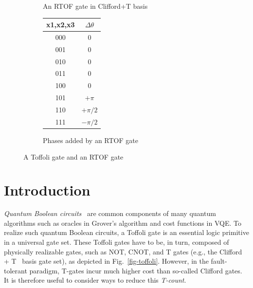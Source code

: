\documentclass[paper]{ieice}
\makeatletter
\newcommand{\sublabel}[1]{\protected@edef\@currentlabel{\thefigure(\thesubfigure)}\label{#1}} %
\providecommand{\DIFadd}[1]{{\protect\color{blue}{#1}}} %
\providecommand{\DIFaddbegin}{} %
\providecommand{\DIFaddend}{} %
\newcommand{\DIFaddincludegraphics}[2][]{{\color{blue}\fbox{\DIFOincludegraphics[#1]{#2}}}} %
\DeclareRobustCommand{\DIFaddbegin}{\DIFOaddbegin \let\includegraphics\DIFaddincludegraphics} %
\DeclareRobustCommand{\DIFaddend}{\DIFOaddend \let\includegraphics\DIFOincludegraphics} %
\makeatother
\begin{document}
\begin{figure}[t]
\begin{minipage}{0.6\textwidth}
\begin{subfigure}[b][15mm]{0.9\textwidth}
            \caption{An RTOF gate in Clifford+T basis}
            \sublabel{fig-rtof}
        \end{subfigure}
    \end{minipage}
    \hspace{10mm}
    \begin{minipage}{0.3\textwidth}
    \vspace{10mm}
        \begin{subfigure}[b][30mm]{\textwidth}
        \centering
        \begin{tabular}{c|c}      
            \hline
            {x1,x2,x3} & $\Delta\theta$  \\  
            \hline
            000   & 0      \\
            001   & 0      \\
            010   & 0      \\
            011   & 0      \\
            100   & 0      \\
            101   & $+\pi$          \\
            110   & $+\pi/2$   \\
            111   & $-\pi/2$ \\
            \hline
        \end{tabular}
        \caption{Phases added by an RTOF gate}
        \sublabel{table-rtof}
        \end{subfigure}
    \end{minipage}
    \caption{A Toffoli gate and an RTOF gate}
    \label{fig-tof-rtof}
\end{figure}

\section{Introduction}

{\it Quantum Boolean circuits}~\cite{bib-ddmf} are common components of many quantum algorithms such as oracles in Grover's algorithm and cost functions in VQE. To realize such quantum Boolean circuits, a Toffoli gate is an essential logic primitive in a universal gate set. These Toffoli gates have to be, in turn, composed of physically realizable gates, such as NOT, CNOT, and T gates (e.g., the Clifford + T~\cite{bib-barenco-elementary} basis gate set), as depicted in Fig.~\ref{fig-toffoli}. However, in the fault-tolerant paradigm, T-gates incur much higher cost than so-called Clifford gates. It is therefore useful to consider ways to reduce this {\it T-count}\DIFaddbegin \DIFadd{, which is the number of both the T-gates and their inverse in the circuit}\DIFaddend .
\end{document}
